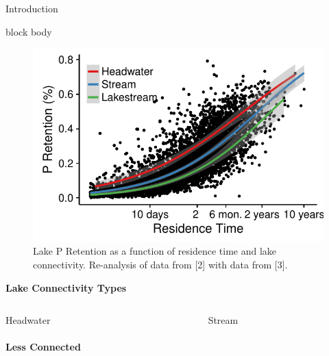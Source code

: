 \documentclass[final,hyperref={pdfpagelabels=false}]{beamer}
\begin{document}
\begin{frame}[t]
\begin{columns}[t]
\begin{column}{.465\textwidth}
\begin{block}{Introduction}
\vspace{1em}
{
\begin{beamercolorbox}[wd=\textwidth,rounded=true]{block body}
   \begin{figure}
      \includegraphics[width=\linewidth]{milstead_multi.pdf}
      \caption{Lake P Retention as a function of residence time and lake connectivity. Re-analysis of data from [2] with data from [3].}
   \end{figure}

\vspace{1.4em}

\centering
\textbf{Lake Connectivity Types}

\begin{columns}


\begin{column}{0.3\textwidth}
\centering
\large Headwater \\
\vspace{0.5em}
 \\
\textbf{Less Connected}
\end{column}

\begin{column}{0.3\textwidth}
\centering
\large Stream \\
\vspace{0.5em}
 \\
\textbf{ }
\end{column}


\end{columns}
\end{beamercolorbox}}
\end{block}
\end{column}
\end{columns}
\end{frame}
\end{document}
